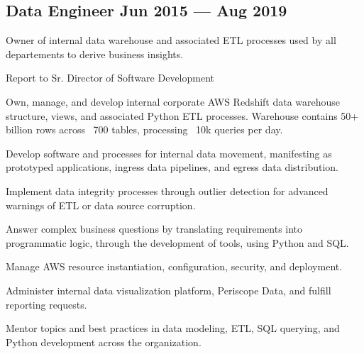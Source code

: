 \documentclass[letter,10pt]{article}
\begin{document}

\subsection{{Data Engineer \hfill Jun 2015 --- Aug 2019}}

\vspace{10pt}

Owner of internal data warehouse and associated ETL processes used by all departements to derive business insights.

Report to Sr. Director of Software Development

\vspace{10pt}

\begin{zitemize}
    \item Own, manage, and develop internal corporate AWS Redshift data warehouse structure, views, and associated Python ETL processes. Warehouse contains 50+ billion rows across ~700 tables, processing ~10k queries per day.
    \item Develop software and processes for internal data movement, manifesting as prototyped applications, ingress data pipelines, and egress data distribution.
    \item Implement data integrity processes through outlier detection for advanced warnings of ETL or data source corruption.
    \item Answer complex business questions by translating requirements into programmatic logic, through the development of tools, using Python and SQL.
    \item Manage AWS resource instantiation, configuration, security, and deployment.
    \item Administer internal data visualization platform, Periscope Data, and fulfill reporting requests.
    \item Mentor topics and best practices in data modeling, ETL, SQL querying, and Python development across the organization.
\end{zitemize}
\end{document}
